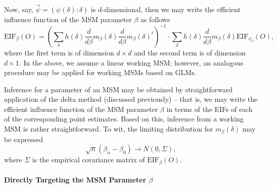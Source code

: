 \documentclass[12pt, krantz2,]{krantz}
\newenvironment{Shaded}{\begin{snugshade}}{\end{snugshade}}
\newcommand{\DecValTok}[1]{\textcolor[rgb]{0.06,0.06,0.06}{#1}}
\newcommand{\FloatTok}[1]{\textcolor[rgb]{0.06,0.06,0.06}{#1}}
\newcommand{\KeywordTok}[1]{\textcolor[rgb]{0.27,0.27,0.27}{\textbf{#1}}}
\newcommand{\NormalTok}[1]{#1}
\newcommand{\OperatorTok}[1]{\textcolor[rgb]{0.43,0.43,0.43}{\textbf{#1}}}
\newcommand{\StringTok}[1]{\textcolor[rgb]{0.5,0.5,0.5}{#1}}
\let\oldparagraph\paragraph
\renewcommand{\paragraph}[1]{\oldparagraph{#1}\mbox{}}
\theoremstyle{definition}
\theoremstyle{definition}
\theoremstyle{definition}
\newcommand{\1}{\mathbbm{1}}
\begin{document}
Now, say, \(\vec{\psi} = (\psi(\delta): \delta)\) is d-dimensional, then we may
write the efficient influence function of the MSM parameter \(\beta\) as follows
\[\text{EIF}_{\beta}(O) = \left(\sum_{\delta} h(\delta) \frac{d}{d\beta}
m_{\beta}(\delta) \frac{d}{d\beta} m_{\beta}(\delta)^t \right)^{-1} \cdot
\sum_{\delta} h(\delta) \frac{d}{d\beta} m_{\beta}(\delta)
\text{EIF}_{\psi_{\delta}}(O),\] where the first term is of dimension
\(d \times d\) and the second term is of dimension \(d \times 1\). In the above, we
assume a linear working MSM; however, an analogous procedure may be applied for
working MSMs based on GLMs.

Inference for a parameter of an MSM may be obtained by straightforward
application of the delta method (discussed previously) -- that is, we may
write the efficient influence function of the MSM parameter \(\beta\) in terms of
the EIFs of each of the corresponding point estimates. Based on this, inference
from a working MSM is rather straightforward. To wit, the limiting distribution
for \(m_{\beta}(\delta)\) may be expressed \[\sqrt{n}(\beta_n - \beta_0) \to N(0,
\Sigma),\] where \(\Sigma\) is the empirical covariance matrix of
\(\text{EIF}_{\beta}(O)\).

\begin{Shaded}
\end{Shaded}

\hypertarget{directly-targeting-the-msm-parameter-beta}{%
\paragraph{\texorpdfstring{Directly Targeting the MSM Parameter \(\beta\)}{Directly Targeting the MSM Parameter \textbackslash{}beta}}\label{directly-targeting-the-msm-parameter-beta}}
\end{document}
